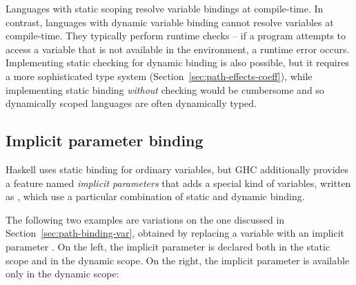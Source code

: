 Languages with static scoping resolve variable bindings at compile-time. In contrast,
languages with dynamic variable binding cannot resolve variables at compile-time. They 
typically perform runtime checks -- if a program attempts to access a variable that is not 
available in the environment, a runtime error occurs. Implementing static checking for dynamic
binding is also possible, but it requires a more sophisticated type system 
(Section~\ref{sec:path-effects-coeff}), while implementing static binding \emph{without} checking 
would be cumbersome and so dynamically scoped languages are often dynamically typed.


\subsection{Implicit parameter binding}
\label{sec:path-binding-impl}

Haskell uses static binding for ordinary variables, but GHC additionally provides a feature named
\emph{implicit parameters} \cite{app-implicit-parameters} that adds a special kind of variables,
written as , which use a particular combination of static and dynamic binding.

The following two examples are variations on the one discussed in Section~\ref{sec:path-binding-var},
obtained by replacing a variable  with an implicit parameter . On the left, the
implicit parameter is declared both in the static scope and in the dynamic scope. On the right, the
implicit parameter is available only in the dynamic scope:

